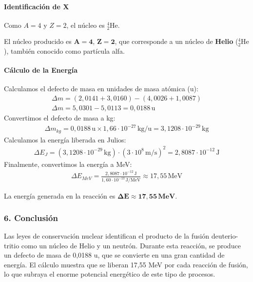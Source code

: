 \paragraph{Identificación de X}
Como $A=4$ y $Z=2$, el núcleo es ${}_2^4\text{He}$.
\begin{cajaresultado}
    El núcleo producido es $\boldsymbol{A=4}$, $\boldsymbol{Z=2}$, que corresponde a un núcleo de \textbf{Helio} (${}_2^4\text{He}$), también conocido como partícula alfa.
\end{cajaresultado}
\paragraph{Cálculo de la Energía}
Calculamos el defecto de masa en unidades de masa atómica (u):
\begin{gather}
    \Delta m = (2,0141 + 3,0160) - (4,0026 + 1,0087) \nonumber \\
    \Delta m = 5,0301 - 5,0113 = 0,0188 \, \text{u}
\end{gather}
Convertimos el defecto de masa a kg:
\begin{gather}
    \Delta m_{kg} = 0,0188 \, \text{u} \times 1,66 \cdot 10^{-27} \, \text{kg/u} = 3,1208 \cdot 10^{-29} \, \text{kg}
\end{gather}
Calculamos la energía liberada en Julios:
\begin{gather}
    \Delta E_J = (3,1208 \cdot 10^{-29} \, \text{kg}) \cdot (3 \cdot 10^8 \, \text{m/s})^2 = 2,8087 \cdot 10^{-12} \, \text{J}
\end{gather}
Finalmente, convertimos la energía a MeV:
\begin{gather}
    \Delta E_{MeV} = \frac{2,8087 \cdot 10^{-12} \, \text{J}}{1,60 \cdot 10^{-13} \, \text{J/MeV}} \approx 17,55 \, \text{MeV}
\end{gather}
\begin{cajaresultado}
    La energía generada en la reacción es $\boldsymbol{\Delta E \approx 17,55 \, \textbf{MeV}}$.
\end{cajaresultado}

\subsubsection*{6. Conclusión}
\begin{cajaconclusion}
Las leyes de conservación nuclear identifican el producto de la fusión deuterio-tritio como un núcleo de Helio y un neutrón. Durante esta reacción, se produce un defecto de masa de 0,0188 u, que se convierte en una gran cantidad de energía. El cálculo muestra que se liberan 17,55 MeV por cada reacción de fusión, lo que subraya el enorme potencial energético de este tipo de procesos.
\end{cajaconclusion}

